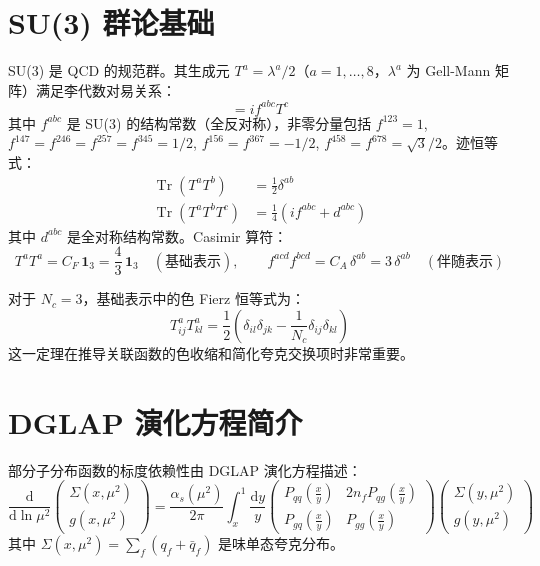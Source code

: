 \documentclass[11pt,a4paper]{ctexart}
\newcommand{\tr}{\operatorname{Tr}}
\begin{document}
\section{SU(3) 群论基础}

SU(3) 是 QCD 的规范群。其生成元 $T^a = \lambda^a/2$（$a=1,\ldots,8$，$\lambda^a$ 为 Gell-Mann 矩阵）满足李代数对易关系：
\begin{equation}
[T^a, T^b] = i f^{abc} T^c
\end{equation}
其中 $f^{abc}$ 是 SU(3) 的结构常数（全反对称），非零分量包括 $f^{123}=1$, $f^{147}=f^{246}=f^{257}=f^{345}=1/2$, $f^{156}=f^{367}=-1/2$, $f^{458}=f^{678}=\sqrt{3}/2$。迹恒等式：
\begin{align}
\tr(T^a T^b) &= \frac{1}{2} \delta^{ab} \\
\tr(T^a T^b T^c) &= \frac{1}{4} (i f^{abc} + d^{abc})
\end{align}
其中 $d^{abc}$ 是全对称结构常数。Casimir 算符：
\begin{equation}
T^a T^a = C_F \, \mathbf{1}_3 = \frac{4}{3} \, \mathbf{1}_3 \quad (\text{基础表示}), \qquad
f^{acd} f^{bcd} = C_A \, \delta^{ab} = 3 \, \delta^{ab} \quad (\text{伴随表示})
\end{equation}

对于 $N_c = 3$，基础表示中的色 Fierz 恒等式为：
\begin{equation}
T^a_{ij} T^a_{kl} = \frac{1}{2} \left( \delta_{il} \delta_{jk} - \frac{1}{N_c} \delta_{ij} \delta_{kl} \right)
\end{equation}
这一定理在推导关联函数的色收缩和简化夸克交换项时非常重要。

\section{DGLAP 演化方程简介}

部分子分布函数的标度依赖性由 DGLAP 演化方程描述：
\begin{equation}
\frac{\mathrm{d}}{\mathrm{d}\ln \mu^2}
\begin{pmatrix} \Sigma(x,\mu^2) \\ g(x,\mu^2) \end{pmatrix} =
\frac{\alpha_s(\mu^2)}{2\pi} \int_x^1 \frac{\mathrm{d}y}{y}
\begin{pmatrix}
P_{qq}(\frac{x}{y}) & 2n_f P_{qg}(\frac{x}{y}) \\[4pt]
P_{gq}(\frac{x}{y}) & P_{gg}(\frac{x}{y})
\end{pmatrix}
\begin{pmatrix} \Sigma(y,\mu^2) \\ g(y,\mu^2) \end{pmatrix}
\end{equation}
其中 $\Sigma(x,\mu^2) = \sum_f (q_f + \bar{q}_f)$ 是味单态夸克分布。
\end{document}
